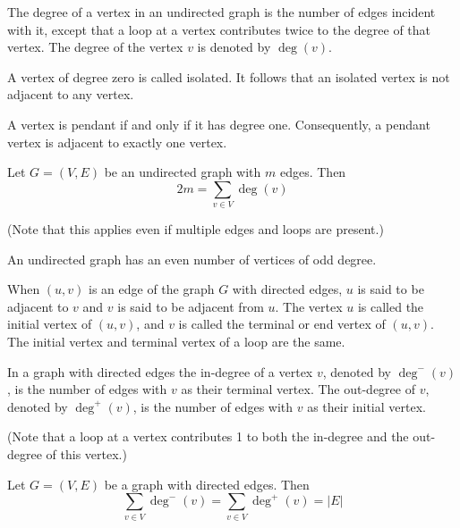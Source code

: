 \documentclass[../discrete.tex]{subfiles}
\begin{document}
\begin{definition}
    The degree of a vertex in an undirected graph is the number of edges incident with it, except that a loop at a vertex 
    contributes twice to the degree of that vertex. The degree of the vertex $v$ is denoted by $\deg(v)$.
\end{definition}

A vertex of degree zero is called isolated. It follows that an isolated vertex is not adjacent to any vertex.

A vertex is pendant if and only if it has degree one. Consequently, a pendant vertex is adjacent to exactly one vertex.
\pagebreak
\begin{theorem}
    Let $G=(V,E)$ be an undirected graph with $m$ edges. Then 
    \[ 2m = \sum_{v\in V}\deg(v) \]

    (Note that this applies even if multiple edges and loops are present.)
\end{theorem}

\begin{theorem}
    An undirected graph has an even number of vertices of odd degree.
\end{theorem}

\begin{definition}
    When $(u,v)$ is an edge of the graph $G$ with directed edges, $u$ is said to be adjacent to $v$ and $v$ is said to be adjacent from $u$.
    The vertex $u$ is called the initial vertex of $(u,v)$, and $v$ is called the terminal or end vertex of $(u,v)$. The initial 
    vertex and terminal vertex of a loop are the same.
\end{definition}

\begin{definition}
    In a graph with directed edges the in-degree of a vertex $v$, denoted by $\deg^- (v)$, is the number of edges with $v$ as their terminal vertex.
    The out-degree of $v$, denoted by $\deg^+ (v)$, is the number of edges with $v$ as their initial vertex. 

    (Note that a loop at a vertex contributes 1 to both the in-degree and the out-degree of this vertex.)
\end{definition}

\begin{theorem}
    Let $G=(V,E)$ be a graph with directed edges. Then 
    \[ \sum_{v\in V}\deg^- (v) = \sum_{v\in V} \deg^+ (v) = |E| \]
\end{theorem}
\end{document}
